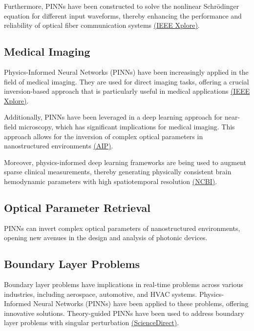 \documentclass[12pt]{article}
\begin{document}
	Furthermore, PINNs have been constructed to solve the nonlinear Schrödinger equation for different input waveforms, thereby enhancing the performance and reliability of optical fiber communication systems \href{https://ieeexplore.ieee.org/document/9489953/}{(IEEE Xplore)}.
	
	
	\subsection{Medical Imaging}
	Physics-Informed Neural Networks (PINNs) have been increasingly applied in the field of medical imaging. They are used for direct imaging tasks, offering a crucial inversion-based approach that is particularly useful in medical applications \href{https://ieeexplore.ieee.org/document/9897269}{(IEEE Xplore)}. 
	
	Additionally, PINNs have been leveraged in a deep learning approach for near-field microscopy, which has significant implications for medical imaging. This approach allows for the inversion of complex optical parameters in nanostructured environments \href{https://pubs.aip.org/aip/app/article/7/1/010802/2835099}{(AIP)}. 
	
	Moreover, physics-informed deep learning frameworks are being used to augment sparse clinical measurements, thereby generating physically consistent brain hemodynamic parameters with high spatiotemporal resolution \href{https://www.ncbi.nlm.nih.gov/pmc/articles/PMC9437127}{(NCBI)}.
	
	
	\subsection{Optical Parameter Retrieval}
	PINNs can invert complex optical parameters of nanostructured environments, opening new avenues in the design and analysis of photonic devices.
	
	\subsection{Boundary Layer Problems}
	Boundary layer problems have implications in real-time problems across various industries, including aerospace, automotive, and HVAC systems. Physics-Informed Neural Networks (PINNs) have been applied to these problems, offering innovative solutions. Theory-guided PINNs have been used to address boundary layer problems with singular perturbation \href{https://www.sciencedirect.com/science/article/pii/S0021999122008312}{(ScienceDirect)}. 
	
\end{document}
